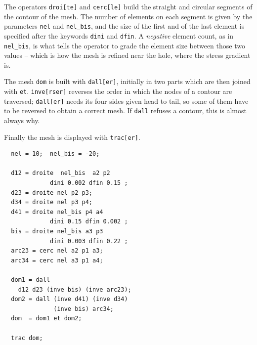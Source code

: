\begin{castemcom}
The operators \texttt{droi[te]} and \texttt{cerc[le]} build the straight and
circular segments of the contour of the mesh. The number of elements on each
segment is given by the parameters \texttt{nel} and \texttt{nel\_bis}, and
the size of the first and of the last element is specified after the keywords
\texttt{dini} and \texttt{dfin}. A \emph{negative} element count, as in
\texttt{nel\_bis}, is what tells the operator to grade the element size
between those two values -- which is how the mesh is refined near the hole,
where the stress gradient is.

The mesh \texttt{dom} is built with \texttt{dall[er]}, initially in two
parts which are then joined with \texttt{et}. \texttt{inve[rser]} reverses
the order in which the nodes of a contour are traversed; \texttt{dall[er]}
needs its four sides given head to tail, so some of them have to be reversed
to obtain a correct mesh. If \texttt{dall} refuses a contour, this is almost
always why.

Finally the mesh is displayed with \texttt{trac[er]}. 

\end{castemcom}
\begin{castemlines}
\begin{verbatim}
  nel = 10;  nel_bis = -20;

  d12 = droite  nel_bis  a2 p2 
             dini 0.002 dfin 0.15 ;
  d23 = droite nel p2 p3;
  d34 = droite nel p3 p4;
  d41 = droite nel_bis p4 a4 
             dini 0.15 dfin 0.002 ;
  bis = droite nel_bis a3 p3 
             dini 0.003 dfin 0.22 ;
  arc23 = cerc nel a2 p1 a3;
  arc34 = cerc nel a3 p1 a4;   

  dom1 = dall 
    d12 d23 (inve bis) (inve arc23);
  dom2 = dall (inve d41) (inve d34) 
              (inve bis) arc34;
  dom  = dom1 et dom2;
  
  trac dom;

\end{verbatim}
\end{castemlines}

